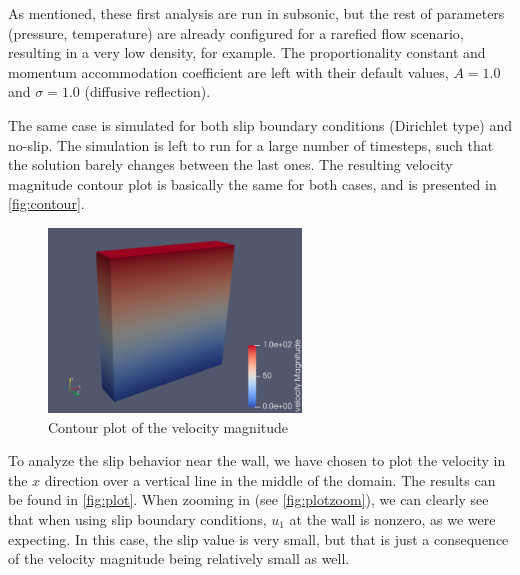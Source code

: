 \documentclass{ucb}
\begin{document}
As mentioned, these first analysis are run in subsonic, but the rest of parameters (pressure, temperature) are already configured for a rarefied flow scenario, resulting in a very low density, for example. The proportionality constant and momentum accommodation coefficient are left with their default values, $A = 1.0$ and $\sigma = 1.0$ (diffusive reflection).

The same case is simulated for both slip boundary conditions (Dirichlet type) and no-slip. The simulation is left to run for a large number of timesteps, such that the solution barely changes between the last ones. The resulting velocity magnitude contour plot is basically the same for both cases, and is presented in \autoref{fig:contour}.

\begin{figure}[H]
    \centering
    \includegraphics[width = 0.6\textwidth]{img/contour.png}
    \caption{Contour plot of the velocity magnitude}
    \label{fig:contour}
\end{figure}

To analyze the slip behavior near the wall, we have chosen to plot the velocity in the $x$ direction over a vertical line in the middle of the domain. The results can be found in \autoref{fig:plot}. When zooming in (see \ref{fig:plotzoom}), we can clearly see that when using slip boundary conditions, $u_1$ at the wall is nonzero, as we were expecting. In this case, the slip value is very small, but that is just a consequence of the velocity magnitude being relatively small as well.
\end{document}
